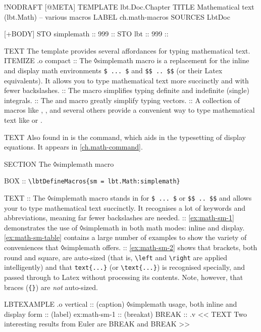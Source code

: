 \begin{lbt}
  !NODRAFT
  [@META]
    TEMPLATE lbt.Doc.Chapter
    TITLE Mathematical text \textsf{(lbt.Math)} -- various macros
    LABEL ch.math-macros
    SOURCES LbtDoc

  [+BODY]
    STO simplemath :: 999 :: 
    STO lbt :: 999 :: \lbtlogo{}

    TEXT The  template provides several affordances for typing mathematical text.
    ITEMIZE .o compact
    :: The ◊simplemath macro is a replacement for the inline and display math environments \Verb|$ ... $| and \Verb|$$ .. $$| (or their Latex equivalents). It allows you to type mathematical text more succinctly and with fewer backslashes.
    :: The  macro simplifies typing definite and indefinite (single) integrals.
    :: The  and  macro greatly simplify typing vectors.
    :: A collection of macros like , ,  and several others provide a convenient way to type mathematical text like  or .

    TEXT Also found in  is the  command, which aids in the typesetting of display equations. It appears in \cref{ch.math-command}.

    SECTION The ◊simplemath macro

    BOX :: \verb|\lbtDefineMacros{sm = lbt.Math:simplemath}|

    TEXT
    :: The ◊simplemath macro stands in for \Verb|$ ... $| or \Verb|$$ .. $$| and allows your to type mathematical text succinctly. It recognises a lot of keywords and abbreviations, meaning far fewer backslashes are needed.
    :: \cref{ex:math-sm-1} demonstrates the use of ◊simplemath in both math modes: inline and display. \cref{ex:math-sm-table} contains a large number of examples to show the variety of conveniences that ◊simplemath offers.
    :: \cref{ex:math-sm-2} shows that brackets, both round and square, are auto-sized (that is, \Verb|\left| and \Verb|\right| are applied intelligently) and that \Verb|text{...}| (or \Verb|\text{...}|) is recognised specially, and passed through to Latex without processing its contents. Note, however, that braces (\Verb|{}|) are \emph{not} auto-sized.

    LBTEXAMPLE .o vertical
    :: (caption) ◊simplemath usage, both inline and display form
    :: (label) ex:math-sm-1
    :: (breakat) BREAK
    :: .v <<
      TEXT Two interesting results from Euler are BREAK  and BREAK 
    >>


\end{lbt}
